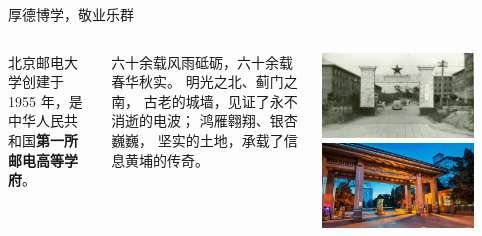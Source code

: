 \documentclass[aspectratio=169, utf8, fontset=windows]{beamer}
\begin{document}
\begin{frame}{厚德博学，敬业乐群}
    \begin{columns}
        \setlength{\parindent}{2em}

        北京邮电大学创建于 1955 年，是中华人民共和国\textcolor{Fore}{\textbf{第一所邮电高等学府}}。

        六十余载风雨砥砺，六十余载春华秋实。
        明光之北、蓟门之南，
        古老的城墙，见证了永不消逝的电波；
        鸿雁翱翔、银杏巍巍，
        坚实的土地，承载了信息黄埔的传奇。

        \centering
        \includegraphics[width=0.8\textwidth]{./resources/1.jpg}\\%

        \includegraphics[width=0.8\textwidth]{./resources/2.jpg}
    \end{columns}
\end{frame}
\end{document}
